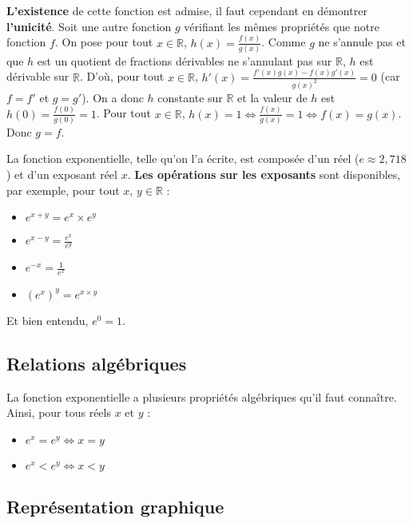 	\begin{demonstration}[Existence]
		\textbf{L'existence} de cette fonction est admise, il faut cependant en démontrer \textbf{l'unicité}.
		\newpar
		Soit une autre fonction $g$ vérifiant les mêmes propriétés que notre fonction $f$. On pose pour tout $x \in \mathbb{R}$, $h(x) = \frac{f(x)}{g(x)}$.
		\newpar
		Comme $g$ ne s'annule pas et que $h$ est un quotient de fractions dérivables ne s'annulant pas sur $\mathbb{R}$, $h$ est dérivable sur $\mathbb{R}$.
		\newpar
		D'où, pour tout $x \in \mathbb{R}$, $h'(x) = \frac{f'(x)g(x) - f(x)g'(x)}{g(x)^2} = 0$ (car $f = f'$ et $g = g'$).
		\newpar
		On a donc $h$ constante sur $\mathbb{R}$ et la valeur de $h$ est $h(0) = \frac{f(0)}{g(0)} = 1$.
		\newpar
		Pour tout $x \in \mathbb{R}$, $h(x) = 1 \iff \frac{f(x)}{g(x)} = 1 \iff f(x) = g(x)$. Donc $g = f$.
	\end{demonstration}
	
	\begin{tip}[Formules]
		La fonction exponentielle, telle qu'on l'a écrite, est composée d'un réel ($e \approx 2,718 $) et d'un exposant réel $x$. \textbf{Les opérations sur les exposants} sont disponibles, par exemple, pour tout $x$, $y \in \mathbb{R}$ :
		\begin{itemize}
			\item $e^{x+y} = e^x \times e^y$
			\item $e^{x-y} = \frac{e^x}{e^y}$
			\item $e^{-x} = \frac{1}{e^x}$
			\item $(e^x)^y = e^{x \times y}$
		\end{itemize}
		Et bien entendu, $e^0 = 1$.
	\end{tip}
	
	\subsection{Relations algébriques}
	
	\begin{formula}
		La fonction exponentielle a plusieurs propriétés algébriques qu'il faut connaître. Ainsi, pour tous réels $x$ et $y$ :
		\begin{itemize}
			\item $e^x = e^y \iff x = y$
			\item $e^x < e^y \iff x < y$
		\end{itemize}
	\end{formula}
	
	\subsection{Représentation graphique}
	

